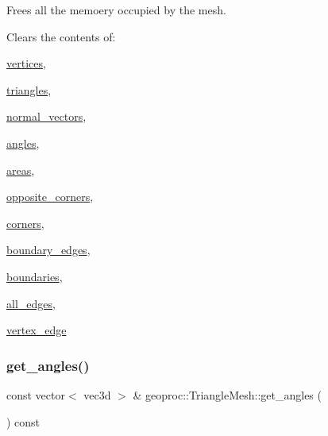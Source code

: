 Frees all the memoery occupied by the mesh. 

Clears the contents of\+:
\begin{DoxyItemize}
\item \hyperlink{classgeoproc_1_1TriangleMesh_a72052fc497d349c48966b937e5e3e834}{vertices},
\item \hyperlink{classgeoproc_1_1TriangleMesh_ad1cf20622f2bb080100862f413bd89c2}{triangles},
\item \hyperlink{classgeoproc_1_1TriangleMesh_a9fa270e81bcf0b9acf03696d9d0c9264}{normal\+\_\+vectors},
\item \hyperlink{classgeoproc_1_1TriangleMesh_a50b5456f546551aa39d68487614d7720}{angles},
\item \hyperlink{classgeoproc_1_1TriangleMesh_a134859a7251c2ae7c8b64b2e44e8ad0e}{areas},
\item \hyperlink{classgeoproc_1_1TriangleMesh_a2604795c90c694116513252b86d242b4}{opposite\+\_\+corners},
\item \hyperlink{classgeoproc_1_1TriangleMesh_ab9610d614e081deb28010d237fecd55b}{corners},
\item \hyperlink{classgeoproc_1_1TriangleMesh_a142a764ddf07b98c7efcd596d88c3f87}{boundary\+\_\+edges},
\item \hyperlink{classgeoproc_1_1TriangleMesh_a57162eac37831c87786a8dab8331d72f}{boundaries},
\item \hyperlink{classgeoproc_1_1TriangleMesh_ab10f052ad932cd78056a55b58ddd475c}{all\+\_\+edges},
\item \hyperlink{classgeoproc_1_1TriangleMesh_abbc25699f67776fc99c909124b0c584a}{vertex\+\_\+edge} 
\end{DoxyItemize}\mbox{\label{classgeoproc_1_1TriangleMesh_aeb65492e33c37f47b12fe41a7e58c79d}} 
\subsubsection{\texorpdfstring{get\+\_\+angles()}{get\_angles()}}
{\footnotesize\ttfamily const vector$<$ vec3d $>$ \& geoproc\+::\+Triangle\+Mesh\+::get\+\_\+angles (\begin{DoxyParamCaption}{ }\end{DoxyParamCaption}) const}



